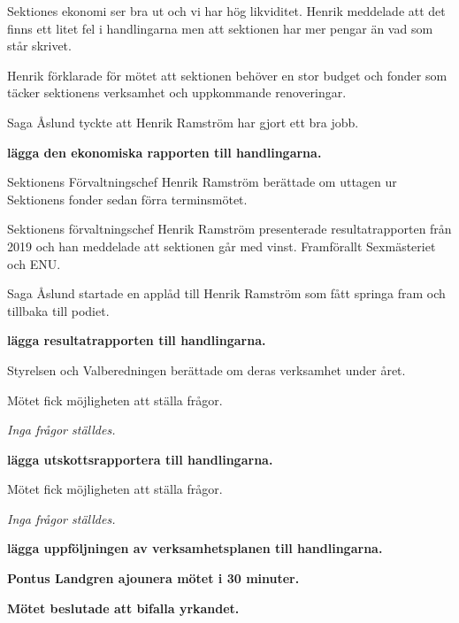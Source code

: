 \documentclass[10pt]{article}
\begin{document}
\begin{paragrafer}
Sektiones ekonomi ser bra ut och vi har hög likviditet. Henrik meddelade att det finns ett litet fel i handlingarna men att sektionen har mer pengar än vad som står skrivet. 

Henrik förklarade för mötet att sektionen behöver en stor budget och fonder som täcker sektionens verksamhet och uppkommande renoveringar. 

Saga Åslund tyckte att Henrik Ramström har gjort ett bra jobb. 

\textbf{\Mba lägga den ekonomiska rapporten till handlingarna.}

Sektionens Förvaltningschef Henrik Ramström berättade om uttagen ur Sektionens fonder sedan förra terminsmötet.



Sektionens förvaltningschef Henrik Ramström presenterade resultatrapporten från 2019 och han meddelade att sektionen går med vinst. Framförallt Sexmästeriet och ENU. 

Saga Åslund startade en applåd till Henrik Ramström som fått springa fram och tillbaka till podiet. 

\textbf{\Mba lägga resultatrapporten till handlingarna.}

Styrelsen och Valberedningen berättade om deras verksamhet under året.

Mötet fick möjligheten att ställa frågor.

\textit{Inga frågor ställdes.}

\textbf{\Mba lägga utskottsrapportera till handlingarna.}


Mötet fick möjligheten att ställa frågor.

\textit{Inga frågor ställdes.}

\textbf{\Mba lägga uppföljningen av verksamhetsplanen till handlingarna.}


\textbf{Pontus Landgren \ypa ajounera mötet i 30 minuter.}

\textbf{Mötet beslutade att bifalla yrkandet.}


\end{paragrafer}
\end{document}

